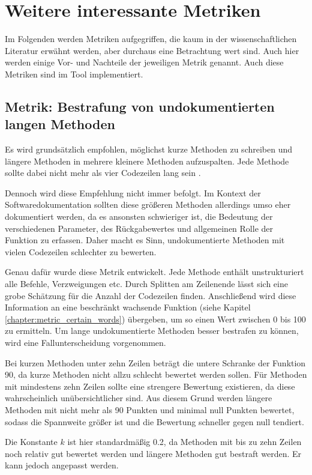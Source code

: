  \section{Weitere interessante Metriken}
 Im Folgenden werden Metriken aufgegriffen, die kaum in der wissenschaftlichen Literatur erwähnt werden, aber durchaus eine Betrachtung wert sind. Auch hier werden einige Vor- und Nachteile der jeweiligen Metrik genannt. Auch diese Metriken sind im Tool implementiert. 
 \subsection{Metrik: Bestrafung von undokumentierten langen Methoden}\label{chapter:metric_method_long}
Es wird grundsätzlich empfohlen, möglichst kurze Methoden zu schreiben und längere Methoden in mehrere kleinere Methoden aufzuspalten. Jede Methode sollte dabei nicht mehr als vier Codezeilen lang sein \cite[S. 34]{martin2009clean}.
 
 Dennoch wird diese Empfehlung nicht immer befolgt. Im Kontext der Softwaredokumentation sollten diese größeren Methoden allerdings umso eher dokumentiert werden, da es ansonsten schwieriger ist, die Bedeutung der verschiedenen Parameter, des Rückgabewertes und allgemeinen Rolle der Funktion zu erfassen. Daher macht es Sinn, undokumentierte Methoden mit vielen Codezeilen schlechter zu bewerten.
 
 Genau dafür wurde diese Metrik entwickelt. Jede Methode enthält unstrukturiert alle Befehle, Verzweigungen etc. Durch Splitten am Zeilenende lässt sich eine grobe Schätzung für die Anzahl der Codezeilen finden. Anschließend wird diese Information an eine beschränkt wachsende Funktion (siehe Kapitel \ref{chapter:metric_certain_words}) übergeben, um so einen Wert zwischen 0 bis 100 zu ermitteln. 
  Um lange undokumentierte Methoden besser bestrafen zu können, wird eine Fallunterscheidung vorgenommen.
 
 Bei kurzen Methoden unter zehn Zeilen beträgt die untere Schranke der Funktion 90, da kurze Methoden nicht allzu schlecht bewertet werden sollen. Für Methoden mit mindestens zehn Zeilen sollte eine strengere Bewertung existieren, da diese wahrscheinlich unübersichtlicher sind. Aus diesem Grund werden längere Methoden mit nicht mehr als 90 Punkten und minimal null Punkten bewertet, sodass die Spannweite größer ist und die Bewertung schneller gegen null tendiert.
 
 Die Konstante $k$ ist hier standardmäßig  0.2, da Methoden mit bis zu zehn Zeilen noch relativ gut bewertet werden und längere Methoden gut bestraft werden. Er kann jedoch angepasst werden.
 
